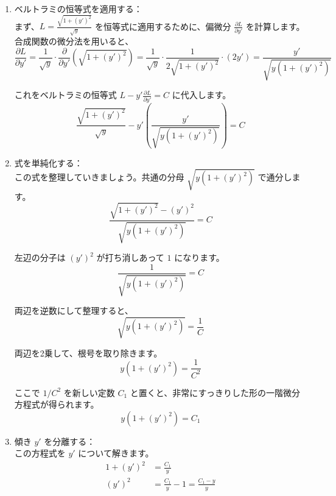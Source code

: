 \documentclass[a4paper,12pt]{bxjsarticle}
\begin{document}
\begin{enumerate}
\item ベルトラミの恒等式を適用する：\\
まず、$L=\frac{\sqrt{1+(y')^2}}{\sqrt{y}}$ を恒等式に適用するために、偏微分 $\frac{\partial L}{\partial y'}$ を計算します。合成関数の微分法を用いると、
\begin{equation}
\frac{\partial L}{\partial y'} = \frac{1}{\sqrt{y}} \cdot \frac{\partial}{\partial y'} \left( \sqrt{1+(y')^2} \right) = \frac{1}{\sqrt{y}} \cdot \frac{1}{2\sqrt{1+(y')^2}} \cdot (2y') = \frac{y'}{\sqrt{y(1+(y')^2)}}
\end{equation}

これをベルトラミの恒等式 $L-y'\frac{\partial L}{\partial y'}=C$ に代入します。
\begin{equation}
\frac{\sqrt{1+(y')^2}}{\sqrt{y}}-y'\left(\frac{y'}{\sqrt{y(1+(y')^2)}}\right)=C
\end{equation}

\item 式を単純化する：\\
この式を整理していきましょう。共通の分母 $\sqrt{y(1+(y')^2)}$ で通分します。
\begin{equation}
\frac{\sqrt{1+(y')^2}-(y')^2}{\sqrt{y(1+(y')^2)}}=C
\end{equation}

左辺の分子は $(y')^2$ が打ち消しあって $1$ になります。
\begin{equation}
\frac{1}{\sqrt{y(1+(y')^2)}}=C
\end{equation}

両辺を逆数にして整理すると、
\begin{equation}
\sqrt{y(1+(y')^2)}=\frac{1}{C}
\end{equation}

両辺を2乗して、根号を取り除きます。
\begin{equation}
y(1+(y')^2)=\frac{1}{C^2}
\end{equation}

ここで $1/C^2$ を新しい定数 $C_1$ と置くと、非常にすっきりした形の一階微分方程式が得られます。
\begin{equation}
y(1+(y')^2)=C_1
\end{equation}

\item 傾き $y'$ を分離する：\\
この方程式を $y'$ について解きます。
\begin{align}
1+(y')^2&=\frac{C_1}{y}\\
(y')^2&=\frac{C_1}{y}-1=\frac{C_1-y}{y}
\end{align}


\end{enumerate}
\end{document}
